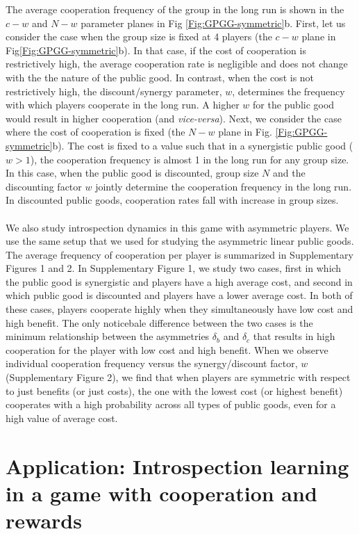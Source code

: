 \documentclass[11pt]{article}
\theoremstyle{plainCl1}
\theoremstyle{plainCl2}
\begin{document}
\noindent The average cooperation frequency of the group in the long run is shown in the $c-w$ and $N-w$ parameter planes in Fig \ref{Fig:GPGG-symmetric}b. First, let us consider the case when the group size is fixed at 4 players (the $c-w$ plane in Fig\ref{Fig:GPGG-symmetric}b). In that case, if the cost of cooperation is restrictively high, the average cooperation rate is negligible and does not change with the the nature of the public good. In contrast, when the cost is not restrictively high, the discount/synergy parameter, $w$, determines the frequency with which players cooperate in the long run. A higher $w$ for the public good would result in higher cooperation (and \emph{vice-versa}). Next, we consider the case where the cost of cooperation is fixed (the $N-w$ plane in Fig. \ref{Fig:GPGG-symmetric}b). The cost is fixed to a value such that in a synergistic public good ($w > 1$), the cooperation frequency is almost 1 in the long run for any group size. In this case, when the public good is discounted, group size $N$ and the discounting factor $w$ jointly determine the cooperation frequency in the long run. In discounted public goods, cooperation rates fall with increase in group sizes.\\ \\
\noindent 
We also study introspection dynamics in this game with asymmetric players. We use the same setup that we used for studying the asymmetric linear public goods. The average frequency of cooperation per player is summarized in Supplementary Figures 1 and 2. In Supplementary Figure 1, we study two cases, first in which the public good is synergistic and players have a high average cost, and second in which public good is discounted and players have a lower average cost. In both of these cases, players cooperate highly when they simultaneously have low cost and high benefit. The only noticebale difference between the two cases is the minimum relationship between the asymmetries $\delta_b$ and $\delta_c$ that results in high cooperation for the player with low cost and high benefit. When we observe individual cooperation frequency versus the synergy/discount factor, $w$ (Supplementary Figure 2), we find that when players are symmetric with respect to just benefits (or just costs), the one with the lowest cost (or highest benefit) cooperates with a high probability across all types of public goods, even for a high value of average cost.

\section{Application: Introspection learning in a game with cooperation and rewards}
\end{document}
